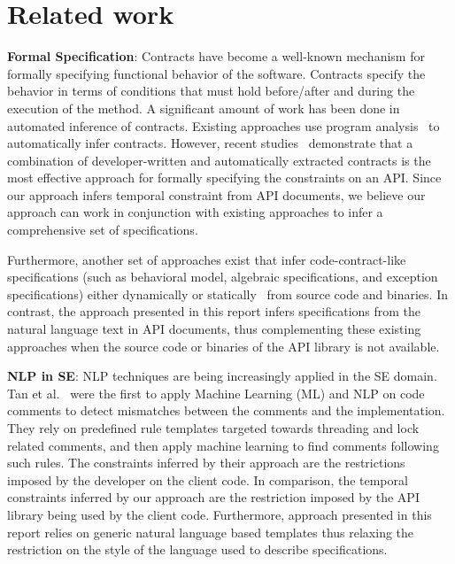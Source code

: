 \section{Related work}
\label{sec:related}


\textbf{Formal Specification}:
Contracts have become a well-known mechanism for formally specifying functional behavior of the software. 
Contracts specify the behavior in terms of conditions that must hold before/after and during the execution of the method.
A significant amount of work has been done in automated inference of contracts.
Existing approaches use program analysis~\cite{csallner08dysy,NimmerE02:ISSTA,Tillmann:2006:DLM:2105385.2105433}
to automatically infer contracts.
However, recent studies~\cite{Polikarpova2009ISSTA,Flanagan2001:HAA} demonstrate that a combination of developer-written and automatically extracted
contracts is the most effective approach for formally specifying the constraints on an API.
Since  our approach infers temporal constraint from API documents, we believe our approach can work in conjunction with existing approaches
to infer a comprehensive set of specifications.
  
Furthermore, another set of approaches exist that infer code-contract-like specifications (such as behavioral model, algebraic specifications, and exception specifications) either dynamically\cite{Henkel07discoveringdocumentation,Ghezzi:2009:SIB:1555001.1555057,Henkel:2008:DDA:1363102.1363105} or statically~\cite{Flanagan2001:HAA,Buse:2008:ADI:1390630.1390664} from source code and binaries. In contrast, the approach presented in this report infers specifications from the natural language text in API documents,
thus complementing these existing approaches when the source code or binaries of the API library is not available.


\textbf{NLP in SE}:
NLP techniques are being increasingly applied in the SE domain. 
Tan et al.~\cite{TanSOSP07} were the first to apply Machine Learning (ML) and NLP on code comments to detect mismatches between the comments and the implementation.
They rely on predefined rule templates targeted towards threading and lock related comments, and then apply machine learning to find comments following such rules.
The constraints inferred by their approach are the restrictions imposed by the developer on the client code.
In comparison, the temporal constraints inferred by our approach are the restriction imposed by the API library being used by the client code.
Furthermore, approach presented in this report relies on generic natural language based templates thus relaxing the restriction on the style of the language used to describe specifications.

